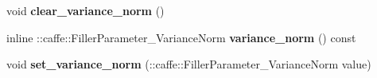 \begin{DoxyCompactItemize}
\mbox{\label{classcaffe_1_1_filler_parameter_af2fe9fefa337c81a549548822c204303}} 
void {\bfseries clear\+\_\+variance\+\_\+norm} ()
\item 
\mbox{\label{classcaffe_1_1_filler_parameter_a8cc674a262d98f0aebac706c0f23282c}} 
inline \+::caffe\+::\+Filler\+Parameter\+\_\+\+Variance\+Norm {\bfseries variance\+\_\+norm} () const
\item 
\mbox{\label{classcaffe_1_1_filler_parameter_a2655457218dabb0adb9734b2503031d6}} 
void {\bfseries set\+\_\+variance\+\_\+norm} (\+::caffe\+::\+Filler\+Parameter\+\_\+\+Variance\+Norm value)
\end{DoxyCompactItemize}
